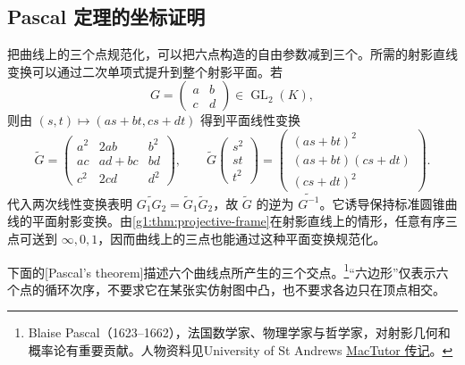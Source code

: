 \subsection{Pascal 定理的坐标证明}
\label{g1:subsec:0205:03}

把曲线上的三个点规范化，可以把六点构造的自由参数减到三个。所需的射影直线变换可以通过二次单项式提升到整个射影平面。若
\[
	G=\begin{pmatrix}a&b\\c&d\end{pmatrix}\in\operatorname{GL}_2(K),
\]
则由 \((s,t)\mapsto(as+bt,cs+dt)\) 得到平面线性变换
\[
	\widetilde G=
	\begin{pmatrix}
		a^2&2ab&b^2\\ ac&ad+bc&bd\\ c^2&2cd&d^2
	\end{pmatrix},\qquad
	\widetilde G\begin{pmatrix}s^2\\st\\t^2\end{pmatrix}
	=\begin{pmatrix}(as+bt)^2\\(as+bt)(cs+dt)\\(cs+dt)^2\end{pmatrix}.
\]
代入两次线性变换表明 \(\widetilde{G_1G_2}=\widetilde G_1\widetilde G_2\)，故 \(\widetilde G\) 的逆为 \(\widetilde{G^{-1}}\)。它诱导保持标准圆锥曲线的平面射影变换。由\cref{g1:thm:projective-frame}在射影直线上的情形，任意有序三点可送到 \(\infty,0,1\)，因而曲线上的三点也能通过这种平面变换规范化。

下面的[Pascal's theorem]描述六个曲线点所产生的三个交点。\footnote{Blaise Pascal（1623--1662），法国数学家、物理学家与哲学家，对射影几何和概率论有重要贡献。人物资料见University of St Andrews \href{https://mathshistory.st-andrews.ac.uk/Biographies/Pascal/}{MacTutor 传记}。}“六边形”仅表示六个点的循环次序，不要求它在某张实仿射图中凸，也不要求各边只在顶点相交。


